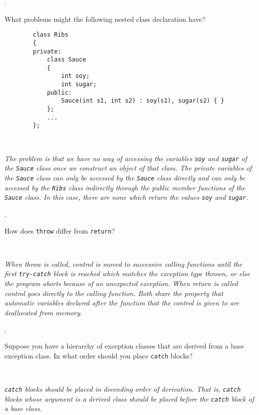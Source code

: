 \documentclass{amsart}
\begin{document}
. 
\begin{minipage}[t]{11.5 cm}
	What problems might the following nested class declaration have?
	\begin{verbatim}
		class Ribs
		{
		private:
		    class Sauce
		    {
		        int soy;
		        int sugar;
		    public:
		        Sauce(int s1, int s2) : soy(s1), sugar(s2) { }
		    };
		    ...
		};
	\end{verbatim}
\end{minipage} \\[1ex]
\phantom{3. } 
\begin{minipage}[t]{11.5 cm}
	{\slshape 
		The problem is that we have no way of accessing the 
		variables \verb+soy+ and \verb+sugar+ of the 
		\verb+Sauce+ class once we construct an object
		of that class.
		The private variables of the \verb+Sauce+ class can only 
		be accessed by the \verb+Sauce+ class directly and
		can only be accessed by the \verb+Ribs+ class indirectly
		through the public member functions of the \verb+Sauce+ class.
		In this case, there are none which return the values 
		\verb+soy+ and \verb+sugar+.
	} 
\end{minipage} 
\vfill

. 
\begin{minipage}[t]{11.5 cm}
	How does \texttt{throw} differ from \texttt{return}?
\end{minipage} \\[1ex]
\phantom{2. } 
\begin{minipage}[t]{11.5 cm}
	{\slshape 
		When throw is called, control is moved to successive calling 
		functions until the first \verb+try-catch+ block is reached
		which matches the exception type thrown, or else the program
		aborts because of an unexpected exception.  
		When return is called control goes directly to the calling
		function.
		Both share the property that automatic variables declared
		after the function that the control is given to are deallocated 
		from memory.
	} 
\end{minipage} 
\vfill
\newpage

\phantom{\quad}\vfill
{}. 
\begin{minipage}[t]{11.5 cm}
	Suppose you have a hierarchy of exception classes that are derived from a base exception class. In what order should you place \texttt{catch} blocks?
\end{minipage} \\[1ex]
\phantom{3. } 
\begin{minipage}[t]{11.5 cm}
	{\slshape 
		\verb+catch+ blocks should be placed in decending order of 
		derivation. 
		That is, \verb+catch+ blocks whose argument is a derived class
		should be placed before the \verb+catch+ block of a base class.
	} 
\end{minipage} 
\vfill
\end{document}

